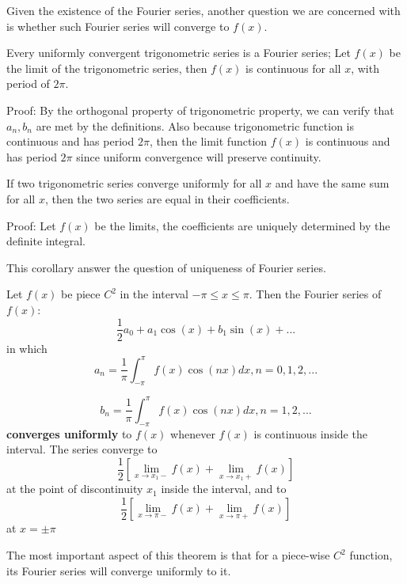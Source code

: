 \begin{refsection}
\begin{remark}
	Given the existence of the Fourier series, another question we are concerned with is whether such Fourier series will converge to $f(x)$.
\end{remark}

\begin{theorem}
	\cite[470]{kaplan1973advanced}Every uniformly convergent trigonometric series is a Fourier series; Let $f(x)$ be the limit of the trigonometric series, then $f(x)$ is continuous for all $x$, with period of $2\pi$.
\end{theorem}
Proof: By the orthogonal property of trigonometric property, we can verify that $a_n,b_n$ are met by the definitions. Also because trigonometric function is continuous and has period $2\pi$, then the limit function $f(x)$ is continuous and has period $2\pi$ since uniform convergence will preserve continuity.

\begin{corollary}
	If two trigonometric series converge uniformly for all $x$ and have the same sum for all $x$, then the two series are equal in their coefficients. 
\end{corollary}
Proof: Let $f(x)$ be the limits, the coefficients are uniquely determined by the definite integral.

\begin{remark}
	This corollary answer the question of uniqueness of Fourier series. 
\end{remark}


\begin{theorem}
	\cite[472]{kaplan1973advanced}
	Let $f(x)$ be piece $C^2$ in the interval $-\pi\leq x \leq \pi$. Then the Fourier series of $f(x)$:
	$$\frac{1}{2}a_0 + a_1 \cos(x) + b_1 \sin(x) + ...$$
	in which 
	$$a_n = \frac{1}{\pi}\int_{-\pi}^\pi f(x)\cos(nx) dx,n=0,1,2,...$$
	
	$$b_n = \frac{1}{\pi}\int_{-\pi}^\pi f(x)\cos(nx) dx,n=1,2,...$$
	\textbf{converges uniformly} to $f(x)$ whenever $f(x)$ is continuous inside the interval. The series converge to 
	$$\frac{1}{2}[\lim_{x\to x_1-} f(x) + \lim_{x\to x_1+} f(x)]$$
	at the point of discontinuity $x_1$ inside the interval, and to 
	$$\frac{1}{2}[\lim_{x\to \pi-} f(x) + \lim_{x\to \pi+} f(x)]$$
	at $x=\pm \pi$
\end{theorem}

\begin{remark}
	The most important aspect of this theorem is that for a piece-wise $C^2$ function, its Fourier series will converge uniformly to it. 
\end{remark}





\end{refsection}
